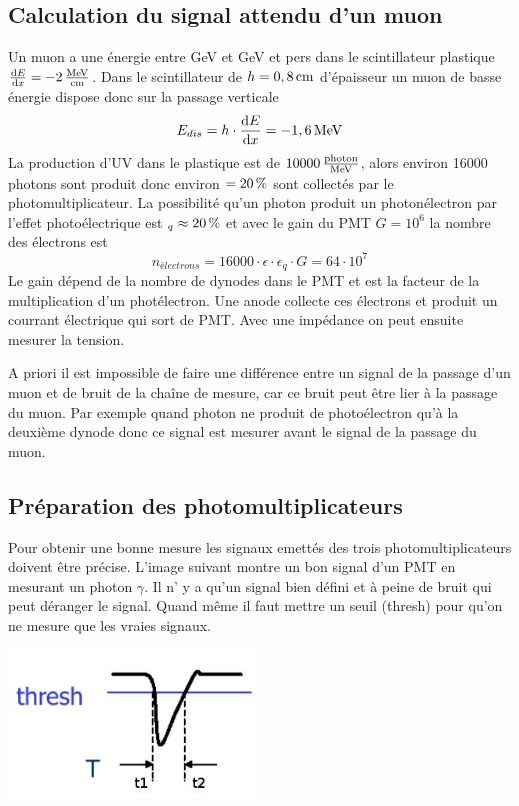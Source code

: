 \documentclass[a4paper,11pt,liststotocnumbered,bibtotocnumbered]{scrartcl}
\begin{document}
  \subsection{Calculation du signal attendu d'un muon}
   Un muon a une énergie entre \unit[1]{GeV} et \unit[1000]{GeV} et pers dans le scintillateur plastique $\frac{\text{d}E}{\text{d}x}=-\unit[2]{\frac{MeV}{cm}}$. Dans le scintillateur de  $h=\unit[0,8]{cm}$ d'épaisseur un muon de basse énergie dispose donc sur la passage verticale
  \begin{equation*}
   E_{dis}=h\cdot\frac{\text{d}E}{\text{d}x}=\unit[-1,6]{MeV}
  \end{equation*}
  La production d'UV dans le plastique est de $\unit[10000]{\frac{photon}{MeV}}$, alors environ 16000 photons sont produit donc environ $\epsilon=\unit[20]{\%}$ sont collectés par le photomultiplicateur. La possibilité qu'un photon produit un photonélectron par l'effet photoélectrique est $\epsilon_q\approx\unit[20]{\%}$ et avec le gain du PMT $G=10^6$ la nombre des électrons est
  \begin{equation}
   n_{électrons}=16000\cdot\epsilon\cdot\epsilon_q\cdot G=64\cdot10^7
  \end{equation}
  Le gain dépend de la nombre de dynodes dans le PMT et est la facteur de la multiplication d'un photélectron. Une anode collecte ces électrons et produit un courrant électrique qui sort de PMT. Avec une impédance on peut ensuite mesurer la tension.


  A priori il est impossible de faire une différence entre un signal de la passage d'un muon et de bruit de la chaîne de mesure, car ce bruit peut être lier à la passage du muon. Par exemple quand photon ne produit de photoélectron qu'à la deuxième dynode donc ce signal est mesurer avant le signal de la passage du muon. 


  
  \subsection{Préparation des photomultiplicateurs}
   Pour obtenir une bonne mesure les signaux emettés des trois photomultiplicateurs doivent être précise. L'image suivant montre un bon signal d'un PMT en mesurant un photon $\gamma$. Il n' y a qu'un signal bien défini et à peine de bruit qui peut déranger le signal. Quand même il faut mettre un seuil (thresh) pour qu'on ne mesure que les vraies signaux.  
   \begin{center}
    \includegraphics[width=0.5\textwidth]{bilder/pmtpuls.jpg}
   \end{center}
  
\end{document}
